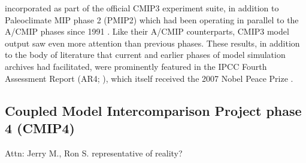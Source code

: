 \documentclass[gmd, preprint]{copernicus}
\newcommand{\mycomment}[1]{}
\def\cred#1{{\color{red}#1}}
\begin{document}
\citep{mcavaney_cloud_2003, webb_cloud_2017} incorporated as part of the official CMIP3 experiment suite, in addition to Paleoclimate MIP phase 2 (PMIP2) which had been operating in parallel to the A/CMIP phases since 1991 \citep{villwock_6th_2003, braconnot_paleoclimate_2011}. Like their A/CMIP counterparts, CMIP3 model output saw even more attention than previous phases. These results, in addition to the body of literature that current and earlier phases of model simulation archives had facilitated, were prominently featured in the IPCC Fourth Assessment Report (AR4; \citet{randall_climate_2007}), which itself received the 2007 Nobel Peace Prize \citep{kerr_nobel_2007}.

\mycomment{
CLIVAR MIPs list circa 2005 - lots ~30
http://web.archive.org/web/20050319232556/http://www.clivar.org/science/mips.htm
This omits the CMIP Coordinated Experiment focus which were all announced in 2002 - https://web.archive.org/web/20040827091054/http://www-pcmdi.llnl.gov/cmip/ - subsequently known as CMIP3
Also https://pcmdi.llnl.gov/mips/cmip/ann_20c3m.html
Also PCMDI provided disks to modelling groups who copied data and posted them back - Meehl et al., 2003
Meehl & Hibbard, 2007: A STRATEGY FOR CLIMATE CHANGE STABILIZATION EXPERIMENTS WITH AOGCMs AND ESMs https://www.agci.org/wp-content/uploads/imported-files/2022/07/06S1_WhitePaper.pdf
C4MIP ~2002 https://web.archive.org/web/20040804013119/http://www.c4mip.cnrs-gif.fr/protocol.html
}


\subsection{Coupled Model Intercomparison Project phase 4 (CMIP4)}
\cred{Attn: Jerry M., Ron S. representative of reality?}
\end{document}
